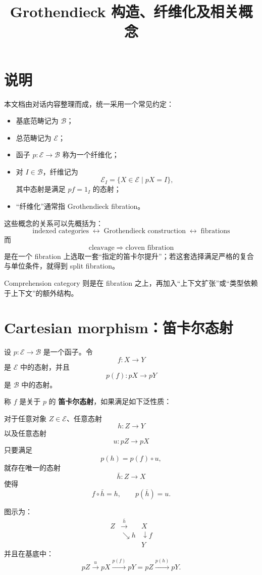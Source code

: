 \documentclass[12pt,a4paper]{article}
\title{Grothendieck 构造、纤维化及相关概念}
\author{}
\date{}
\begin{document}
\maketitle

\tableofcontents
\newpage

\section*{说明}
本文档由对话内容整理而成，统一采用一个常见约定：
\begin{itemize}
  \item 基底范畴记为 \(\mathcal{B}\)；
  \item 总范畴记为 \(\mathcal{E}\)；
  \item 函子 \(p:\mathcal{E}\to\mathcal{B}\) 称为一个纤维化；
  \item 对 \(I\in\mathcal{B}\)，纤维记为
  \[
  \mathcal{E}_I=\{X\in\mathcal{E}\mid pX=I\},
  \]
  其中态射是满足 \(pf=1_I\) 的态射；
  \item “纤维化”通常指 Grothendieck fibration。
\end{itemize}

这些概念的关系可以先概括为：
\[
\boxed{
\text{indexed categories}
\;\longleftrightarrow\;
\text{Grothendieck construction}
\;\longleftrightarrow\;
\text{fibrations}
}
\]
而
\[
\boxed{
\text{cleavage}
\;\Rightarrow\;
\text{cloven fibration}
}
\]
是在一个 fibration 上选取一套“指定的笛卡尔提升”；若这套选择满足严格的复合与单位条件，就得到 split fibration。

Comprehension category 则是在 fibration 之上，再加入“上下文扩张”或“类型依赖于上下文”的额外结构。

\section{Cartesian morphism：笛卡尔态射}

设 \(p:\mathcal{E}\to\mathcal{B}\) 是一个函子。令
\[
f:X\to Y
\]
是 \(\mathcal{E}\) 中的态射，并且
\[
p(f):pX\to pY
\]
是 \(\mathcal{B}\) 中的态射。

称 \(f\) 是关于 \(p\) 的 \textbf{笛卡尔态射}，如果满足如下泛性质：

对于任意对象 \(Z\in\mathcal{E}\)、任意态射
\[
h:Z\to Y
\]
以及任意态射
\[
u:pZ\to pX
\]
只要满足
\[
p(h)=p(f)\circ u,
\]
就存在唯一的态射
\[
\bar{h}:Z\to X
\]
使得
\[
f\circ \bar{h}=h,
\qquad
p(\bar{h})=u.
\]

图示为：
\[
\begin{array}{ccc}
Z & \xrightarrow{\bar{h}} & X\\
& \searrow h & \downarrow f\\
&&Y
\end{array}
\]
并且在基底中：
\[
pZ\xrightarrow{u}pX\xrightarrow{p(f)}pY
=
pZ\xrightarrow{p(h)}pY.
\]
\end{document}
